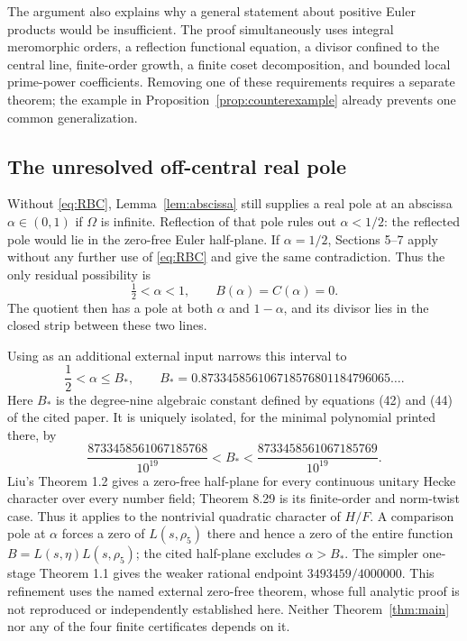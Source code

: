 \documentclass[11pt]{article}
\theoremstyle{definition}
\theoremstyle{remark}
\newcommand{\rh}{\rho_5}
\numberwithin{equation}{section}
\begin{document}
The argument also explains why a general statement about positive Euler products would be insufficient. The proof simultaneously uses integral meromorphic orders, a reflection functional equation, a divisor confined to the central line, finite-order growth, a finite coset decomposition, and bounded local prime-power coefficients. Removing one of these requirements requires a separate theorem; the example in Proposition~\ref{prop:counterexample} already prevents one common generalization.

\subsection{The unresolved off-central real pole}

Without \eqref{eq:RBC}, Lemma~\ref{lem:abscissa} still supplies a real pole at an abscissa $\alpha\in(0,1)$ if $\Omega$ is infinite. Reflection of that pole rules out $\alpha<1/2$: the reflected pole would lie in the zero-free Euler half-plane. If $\alpha=1/2$, Sections 5--7 apply without any further use of \eqref{eq:RBC} and give the same contradiction. Thus the only residual possibility is
\[
\tfrac12<\alpha<1,\qquad B(\alpha)=C(\alpha)=0.
\]
The quotient then has a pole at both $\alpha$ and $1-\alpha$, and its divisor lies in the closed strip between these two lines.

Using \citet[Theorems 1.2 and 8.29]{liu2026} as an additional external input narrows this interval to
\[
\frac12<\alpha\le B_*,
\qquad
B_*=0.873345856106718576801184796065\ldots .
\]
Here \(B_*\) is the degree-nine algebraic constant defined by equations (42) and (44) of the cited paper. It is uniquely isolated, for the minimal polynomial printed there, by
\[
\frac{8733458561067185768}{10^{19}}
<B_*<
\frac{8733458561067185769}{10^{19}}.
\]
Liu's Theorem 1.2 gives a zero-free half-plane for every continuous unitary Hecke character over every number field; Theorem 8.29 is its finite-order and norm-twist case. Thus it applies to the nontrivial quadratic character of \(H/F\). A comparison pole at \(\alpha\) forces a zero of \(L(s,\rh)\) there and hence a zero of the entire function \(B=L(s,\eta)L(s,\rh)\); the cited half-plane excludes \(\alpha>B_*\). The simpler one-stage Theorem 1.1 gives the weaker rational endpoint \(3493459/4000000\). This refinement uses the named external zero-free theorem, whose full analytic proof is not reproduced or independently established here. Neither Theorem~\ref{thm:main} nor any of the four finite certificates depends on it.
\end{document}
